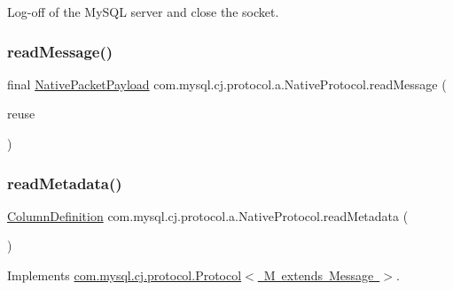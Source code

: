 Log-\/off of the My\+S\+QL server and close the socket. \mbox{\label{classcom_1_1mysql_1_1cj_1_1protocol_1_1a_1_1_native_protocol_a3729eaeefbb45e1742184e1902ed708b}} 
\subsubsection{\texorpdfstring{read\+Message()}{readMessage()}}
{\footnotesize\ttfamily final \mbox{\hyperlink{classcom_1_1mysql_1_1cj_1_1protocol_1_1a_1_1_native_packet_payload}{Native\+Packet\+Payload}} com.\+mysql.\+cj.\+protocol.\+a.\+Native\+Protocol.\+read\+Message (\begin{DoxyParamCaption}\item[{\mbox{\hyperlink{classcom_1_1mysql_1_1cj_1_1protocol_1_1a_1_1_native_packet_payload}{Native\+Packet\+Payload}}}]{reuse }\end{DoxyParamCaption})}

\mbox{\label{classcom_1_1mysql_1_1cj_1_1protocol_1_1a_1_1_native_protocol_ade969eccfe66d5a42008c60897d118d7}} 
\subsubsection{\texorpdfstring{read\+Metadata()}{readMetadata()}}
{\footnotesize\ttfamily \mbox{\hyperlink{interfacecom_1_1mysql_1_1cj_1_1protocol_1_1_column_definition}{Column\+Definition}} com.\+mysql.\+cj.\+protocol.\+a.\+Native\+Protocol.\+read\+Metadata (\begin{DoxyParamCaption}{ }\end{DoxyParamCaption})}



Implements \mbox{\hyperlink{interfacecom_1_1mysql_1_1cj_1_1protocol_1_1_protocol_a65f8a3d80ead4cf22ffe65c539f2f851}{com.\+mysql.\+cj.\+protocol.\+Protocol$<$ M extends Message $>$}}.

